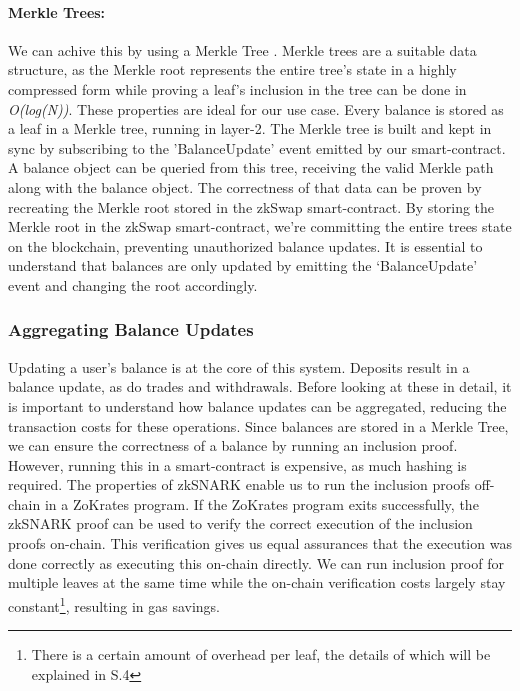 \documentclass[../../thesis.tex]{subfiles}
\begin{document}
\paragraph{Merkle Trees:}
We can achive this by using a Merkle Tree \cite{szydlo2004merkle}. Merkle trees are a suitable data structure, as the Merkle root represents the entire tree's state in a highly compressed form while proving a leaf's inclusion in the tree can be done in \textit{O(log(N))}. These properties are ideal for our use case. Every balance is stored as a leaf in a Merkle tree, running in layer-2. The Merkle tree is built and kept in sync by subscribing to the 'BalanceUpdate' event emitted by our smart-contract. A balance object can be queried from this tree, receiving the valid Merkle path along with the balance object. The correctness of that data can be proven by recreating the Merkle root stored in the zkSwap smart-contract. By storing the Merkle root in the zkSwap smart-contract, we're committing the entire trees state on the blockchain, preventing unauthorized balance updates. It is essential to understand that balances are only updated by emitting the `BalanceUpdate' event and changing the root accordingly. 

\subsubsection{Aggregating Balance Updates} \label{aggr_balance}
Updating a user's balance is at the core of this system. Deposits result in a balance update, as do trades and withdrawals. Before looking at these in detail, it is important to understand how balance updates can be aggregated, reducing the transaction costs for these operations. Since balances are stored in a Merkle Tree, we can ensure the correctness of a balance by running an inclusion proof. However, running this in a smart-contract is expensive, as much hashing is required. The properties of zkSNARK enable us to run the inclusion proofs off-chain in a ZoKrates program. If the ZoKrates program exits successfully, the zkSNARK proof can be used to verify the correct execution of the inclusion proofs on-chain. This verification gives us equal assurances that the execution was done correctly as executing this on-chain directly. We can run inclusion proof for multiple leaves at the same time while the on-chain verification costs largely stay constant\footnote{There is a certain amount of overhead per leaf, the details of which will be explained in S.4}, resulting in gas savings.
\end{document}
